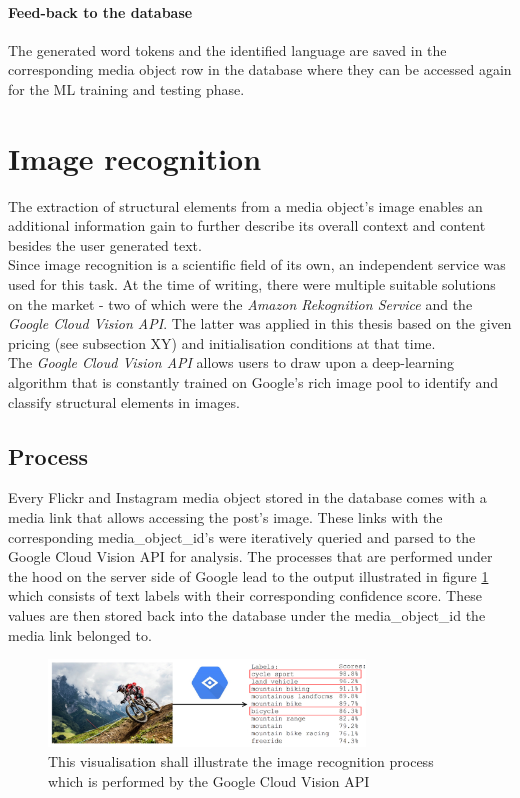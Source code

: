 \paragraph{Feed-back to the database}
The generated word tokens and the identified language are saved in the corresponding media object row in the database where they can be accessed again for the ML training and testing phase.

\section{Image recognition} \label{image_recognition}
The extraction of structural elements from a media object’s image enables an additional information gain to further describe its overall context and content besides the user generated text.\\
\newline
Since image recognition is a scientific field of its own, an independent service was used for this task. At the time of writing, there were multiple suitable solutions on the market - two of which were the \textit{Amazon Rekognition Service} and the \textit{Google Cloud Vision API}. The latter was applied in this thesis based on the given pricing (see subsection XY) and initialisation conditions at that time.\\
The \textit{Google Cloud Vision API} allows users to draw upon a deep-learning algorithm that is constantly trained on Google’s rich image pool to identify and classify structural elements in images.

\subsection{Process}
Every Flickr and Instagram media object stored in the database comes with a media link that allows accessing the post’s image. 
These links with the corresponding media\_object\_id’s were iteratively queried and parsed to the Google Cloud Vision API for analysis. The processes that are performed under the hood on the server side of Google lead to the output illustrated in figure \ref{fig:vision_illustration} which consists of text labels with their corresponding confidence score. These values are then stored back into the database under the media\_object\_id the media link belonged to.

\begin{figure}[h]
   \centering
   \includegraphics[width=0.75\textwidth]{img/vision_illustration.eps}
   \caption{This visualisation shall illustrate the image recognition process which is performed by the Google Cloud Vision API \parencite{2015ImageBiker}}
   \label{fig:vision_illustration}
\end{figure}

